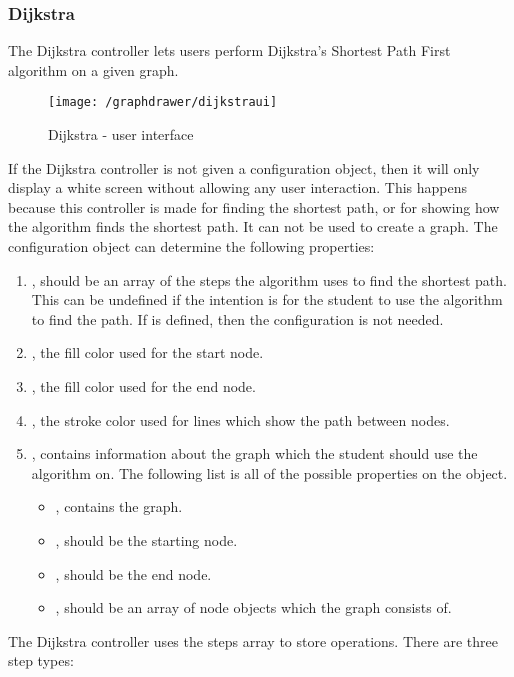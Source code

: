\subsubsection{Dijkstra}
The Dijkstra controller lets users perform Dijkstra's Shortest Path First algorithm on a given graph.
\begin{figure}[H]
    \centering
    \texttt{[image: /graphdrawer/dijkstraui]}
    \caption{Dijkstra - user interface}
    \label{fig:graphdrawerDijkstraUserInterface}
\end{figure}
If the Dijkstra controller is not given a configuration object, then it will only display a white screen without allowing any user interaction. This happens because this controller is made for finding the shortest path, or for showing how the algorithm finds the shortest path. It can not be used to create a graph. The configuration object can determine the following properties:
\begin{enumerate}
    \item {}, should be an array of the steps the algorithm uses to find the shortest path. This can be undefined if the intention is for the student to use the algorithm to find the path. If  is defined, then the  configuration is not needed.
    \item {}, the fill color used for the start node.
    \item {}, the fill color used for the end node.
    \item {}, the stroke color used for lines which show the path between nodes.
    \item {}, contains information about the graph which the student should use the algorithm on. The following list is all of the possible properties on the  object.
    \begin{itemize}
        \item {}, contains the graph.
        \item {}, should be the starting node.
        \item {}, should be the end node.
        \item {}, should be an array of node objects which the graph consists of.
    \end{itemize}
\end{enumerate}
The Dijkstra controller uses the steps array to store operations. There are three step types:
